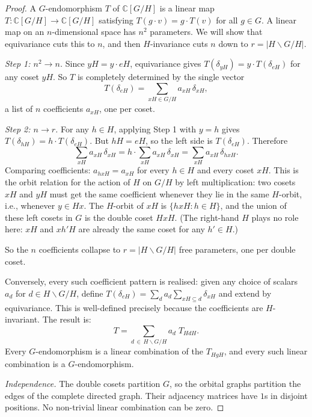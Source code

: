 \documentclass[12pt]{article}
\begin{document}
\begin{proof}
A $G$-endomorphism $T$ of $\mathbb{C}[G/H]$ is a linear map $T \colon \mathbb{C}[G/H] \to \mathbb{C}[G/H]$ satisfying $T(g \cdot v) = g \cdot T(v)$ for all $g \in G$. A linear map on an $n$-dimensional space has $n^2$ parameters. We will show that equivariance cuts this to $n$, and then $H$-invariance cuts $n$ down to $r = |H \backslash G / H|$.

\emph{Step 1: $n^2 \to n$.} Since $yH = y \cdot eH$, equivariance gives $T(\delta_{yH}) = y \cdot T(\delta_{eH})$ for any coset $yH$. So $T$ is completely determined by the single vector
\[
T(\delta_{eH}) = \sum_{xH \in G/H} a_{xH}\, \delta_{xH},
\]
a list of $n$ coefficients $a_{xH}$, one per coset.

\emph{Step 2: $n \to r$.} For any $h \in H$, applying Step 1 with $y = h$ gives $T(\delta_{hH}) = h \cdot T(\delta_{eH})$. But $hH = eH$, so the left side is $T(\delta_{eH})$. Therefore
\[
\sum_{xH} a_{xH}\, \delta_{xH} = h \cdot \sum_{xH} a_{xH}\, \delta_{xH} = \sum_{xH} a_{xH}\, \delta_{hxH}.
\]
Comparing coefficients: $a_{hxH} = a_{xH}$ for every $h \in H$ and every coset $xH$. This is the orbit relation for the action of $H$ on $G/H$ by left multiplication: two cosets $xH$ and $yH$ must get the same coefficient whenever they lie in the same $H$-orbit, i.e., whenever $y \in Hx$. The $H$-orbit of $xH$ is $\{hxH : h \in H\}$, and the union of these left cosets in $G$ is the double coset $HxH$. (The right-hand $H$ plays no role here: $xH$ and $xh'H$ are already the same coset for any $h' \in H$.)

So the $n$ coefficients collapse to $r = |H \backslash G / H|$ free parameters, one per double coset.

Conversely, every such coefficient pattern is realised: given any choice of scalars $a_d$ for $d \in H \backslash G / H$, define $T(\delta_{eH}) = \sum_{d} a_d \sum_{xH \subseteq d} \delta_{xH}$ and extend by equivariance. This is well-defined precisely because the coefficients are $H$-invariant. The result is:
\[
T = \sum_{d \,\in\, H \backslash G / H} a_d \; T_{HdH}.
\]
Every $G$-endomorphism is a linear combination of the $T_{HgH}$, and every such linear combination is a $G$-endomorphism.

\emph{Independence.} The double cosets partition $G$, so the orbital graphs partition the edges of the complete directed graph. Their adjacency matrices have $1$s in disjoint positions. No non-trivial linear combination can be zero.
\end{proof}
\end{document}
